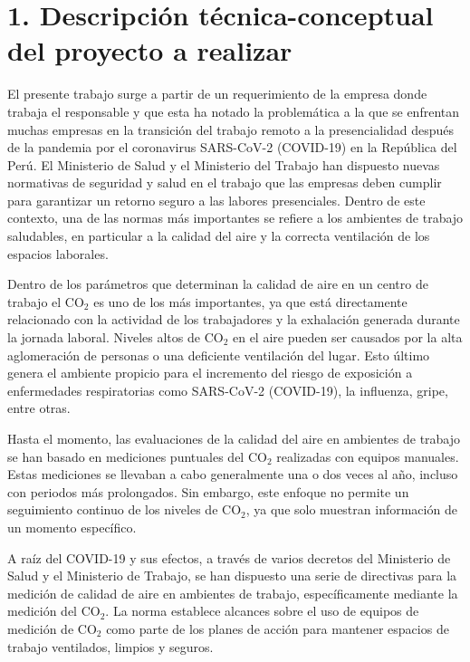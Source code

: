 \documentclass[
11pt, %
]{charter}
\begin{document}
\section{1. Descripción técnica-conceptual del proyecto a realizar}
\label{sec:descripcion}

El presente trabajo surge a partir de un requerimiento de la empresa donde trabaja el responsable y que esta ha notado la problemática a la que se enfrentan muchas empresas en la transición del trabajo remoto a la presencialidad después de la pandemia por el coronavirus SARS-CoV-2 (COVID-19) en la República del Perú. El Ministerio de Salud y el Ministerio del Trabajo han dispuesto nuevas normativas de seguridad y salud en el trabajo que las empresas deben cumplir para garantizar un retorno seguro a las labores presenciales. Dentro de este contexto, una de las normas más importantes se refiere a los ambientes de trabajo saludables, en particular a la calidad del aire y la correcta ventilación de los espacios laborales. 

Dentro de los parámetros que determinan la calidad de aire en un centro de trabajo el CO$_{2}$ es uno de los más importantes, ya que está directamente relacionado con la actividad de los trabajadores y la exhalación generada durante la jornada laboral. Niveles altos de CO$_{2}$ en el aire pueden ser causados por la alta aglomeración de personas o una deficiente ventilación del lugar. Esto último genera el ambiente propicio para el incremento del riesgo de exposición a enfermedades respiratorias como SARS-CoV-2 (COVID-19), la influenza, gripe, entre otras.

Hasta el momento, las evaluaciones de la calidad del aire en ambientes de trabajo se han basado en mediciones puntuales del CO$_{2}$ realizadas con equipos manuales. Estas mediciones se llevaban a cabo generalmente una o dos veces al año, incluso con periodos más prolongados. Sin embargo, este enfoque no permite un seguimiento continuo de los niveles de CO$_{2}$, ya que solo muestran información de un momento específico.

A raíz del COVID-19 y sus efectos, a través de varios decretos del Ministerio de Salud y el Ministerio de Trabajo, se han dispuesto una serie de directivas para la medición de calidad de aire en ambientes de trabajo, específicamente mediante la medición del CO$_{2}$. La norma establece alcances sobre el uso de equipos de medición de CO$_{2}$ como parte de los planes de acción para mantener espacios de trabajo ventilados, limpios y seguros.
\end{document}

